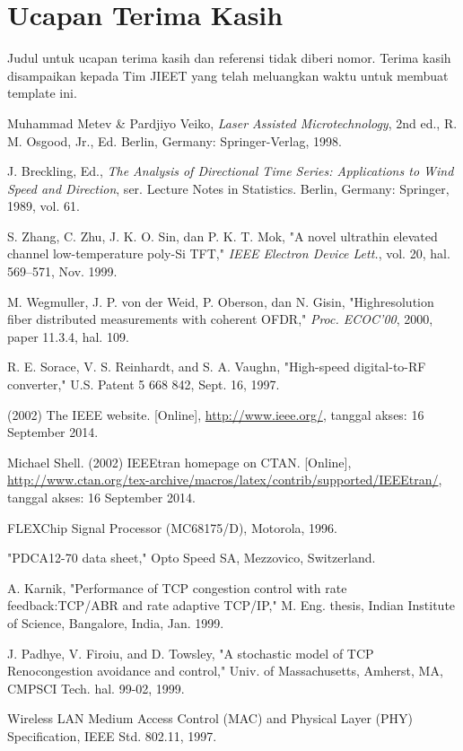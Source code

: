 \documentclass[10pt,twocolumn]{article}
\begin{document}
\section*{Ucapan Terima Kasih}
Judul untuk ucapan terima kasih dan referensi tidak diberi nomor. Terima kasih disampaikan kepada Tim JIEET yang telah meluangkan waktu untuk membuat template ini.


\begin{thebibliography}{99}
\eightp
{}
Muhammad Metev \& Pardjiyo Veiko, \textit{Laser Assisted Microtechnology}, 2nd ed., R. M. Osgood, Jr., Ed. Berlin, Germany: Springer-Verlag, 1998.

J. Breckling, Ed., \textit{The Analysis of Directional Time Series: Applications to Wind Speed and Direction}, ser. Lecture Notes in Statistics. Berlin, Germany: Springer, 1989, vol. 61.

S. Zhang, C. Zhu, J. K. O. Sin, dan P. K. T. Mok, "A novel ultrathin elevated channel low-temperature poly-Si TFT," \textit{IEEE Electron Device Lett.}, vol. 20, hal. 569--571, Nov. 1999.

M. Wegmuller, J. P. von der Weid, P. Oberson, dan N. Gisin, "Highresolution fiber distributed measurements with coherent OFDR," \textit{Proc. ECOC'00}, 2000, paper 11.3.4, hal. 109.

R. E. Sorace, V. S. Reinhardt, and S. A. Vaughn, "High-speed digital-to-RF converter," U.S. Patent 5 668 842, Sept. 16, 1997.

(2002) The IEEE website. [Online], \url{http://www.ieee.org/}, tanggal akses: 16 September 2014.

Michael Shell. (2002) IEEEtran homepage on CTAN. [Online], \url{http://www.ctan.org/tex-archive/macros/latex/contrib/supported/IEEEtran/}, tanggal akses: 16 September 2014.

FLEXChip Signal Processor (MC68175/D), Motorola, 1996.

"PDCA12-70 data sheet," Opto Speed SA, Mezzovico, Switzerland.

A. Karnik, "Performance of TCP congestion control with rate feedback:TCP/ABR and rate adaptive TCP/IP," M. Eng. thesis, Indian Institute of Science, Bangalore, India, Jan. 1999.

J. Padhye, V. Firoiu, and D. Towsley, "A stochastic model of TCP Renocongestion avoidance and control," Univ. of Massachusetts, Amherst, MA, CMPSCI Tech. hal. 99-02, 1999.

Wireless LAN Medium Access Control (MAC) and Physical Layer (PHY) Specification, IEEE Std. 802.11, 1997.

\end{thebibliography}
\end{document}
